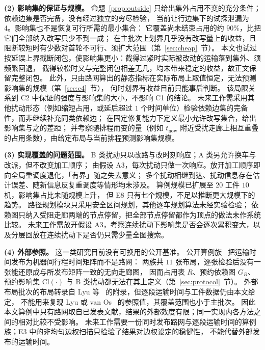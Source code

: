 \documentclass[manuscript,screen,review]{acmart}
\newcommand{\ClosureAliveFrac}{90\%}
\newcommand{\ScaleJobsHi}{20}
\newcommand{\ScaleMachHi}{10}
\newcommand{\ProbeLeaks}{4}
\begin{document}
\textbf{(2) 影响集的保证与规模。}
命题~\ref{prop:outside} 只给出集外占用不变的充分条件；依赖边集是否完备，没有经过独立的穷尽检验，
当前让行边集下的试探泄漏为 \ProbeLeaks。影响集也不是恢复可行所需的最小集合：
它覆盖尚未结束占用的约 \(\ClosureAliveFrac\)，比把它们全部纳入改写只少不到一成；
在主批次上划界几乎没有改写量上的收益，且阻断较短时有少数对首轮不可行、须扩大范围（第~\ref{sec:cheap}~节）。
本文也试过按延误上界截断闭包，使影响集更小：截得过紧时实际被改动的运输落到集外、须频繁回退，
截得较松时又与完整闭包相差无几，均未带来稳定的收益，故正文保留完整闭包。
此外，只由路网算出的静态指标在实际布局上取值恒定，无法预测影响集的规模（第~\ref{sec:e4}~节），
何时划界有收益目前只能事后判断。
该局限关系到 C2 中保证的强度与影响集的大小，不影响 C1 的结论。
未来工作需采用其他扰动形态（例如缩短占用，或延后超过 \(1\) 个时间单位）检验依赖边集的完备性，而非继续补充同类依赖边；
在固定修复能力下定义最小允许改写集合，给出影响集与之的差距；
并考察随排程而变的量（例如 \(t_{\mathrm{now}}\) 附近受扰走廊上相互重叠的占用条数），由给定布局与当前排程预测影响集规模。

\textbf{(3) 实现覆盖的问题范围。}
B 类扰动只以改路与改时刻响应；A 类另允许换车与改派，但不改变加工顺序；
由假设 A3，每次扰动只做一次响应。放开加工顺序即向全局重调度退化，「有界」随之失去意义；
多个扰动相继到达、扰动信息存在估计误差、随新信息反复重调度等情形均未涉及。
算例规模已扩展至 \(\ScaleJobsHi\) 工件 \(\ScaleMachHi\) 机，影响集占比未随规模上升，
但 E8 只有七个规模，不足以推断更大规模下的趋势。
路径规划模块只采用安全区间规划，其他逐车规划算法未经实验检验；
依赖图只纳入受阻走廊两端的节点停留，把全部节点停留都作为顶点的做法未作系统比较。
未来工作需放开假设 A3，考察连续扰动下影响集是否会逐次累积变大，以及分层回放在连续扰动下是否仍只需少量全图搜索。

\textbf{(4) 外部参照。}
这一类研究目前没有可换用的公开基准。
公开算例族~\cite{homayouni2021production,fontes2023hybrid} 把运输时间发布为机器间行程时间矩阵而不是路网：
两族共 \(11\) 张布局，逐张检验后没有一张能还原成与所发布矩阵一致的无向走廊图，
因而占用表 \(R\)、预约依赖图 \(G_R\)、预约影响集 \(\mathrm{Cl}(\cdot)\) 与 B 类扰动都无法在其上定义（第~\ref{sec:protocol}~节）。
外部布局批次的布局转录自 Lyu 等~\cite{lyu2019approach} 的附录，但逐段运输时间与工件数据仍由本文给定，
不能用来复现 Lyu 或 van Os~\cite{vanos2026exact} 的参照值，其覆盖范围也小于主批次。
因此本文算例中只有路网取自已发表文献，结果的外部效度有限；同一实现内各方法之间的相对比较不受影响。
未来工作需要一份同时发布路网与逐段运输时间的算例族；E3 中的非均匀边权扫描只检验了结果对边权设定的稳健性，
不能代替外部发布的运输时间。



\end{document}
